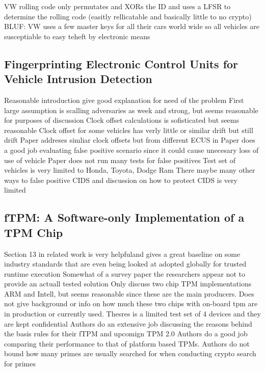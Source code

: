 \documentclass[conference]{journal}
\begin{document}
							
VW rolling code only permutates and XORs the ID and uses a LFSR to determine the rolling code (easitly rellicatable and basically little to no crypto)							
BLUF: VW uses a few master keys for all their cars world wide so all vehicles are susceptiable to easy teheft by electronic means	

\subsection{Fingerprinting Electronic Control Units for Vehicle Intrusion Detection \cite{cho_fingerprinting_2016}}
						
Reasonable introduction give good explanation for need of the problem	
First large assumption is scalling adversaries as week and strong, but seems reasonable for purposes of discussion	
Clock offset calculations is sofisticated but seems reasonable	
Clock offset for some vehicles has verly little or similar drift but still drift	
Paper addreses simliar clock offsets but from different ECUS in 	
Paper does a good job evaluating false positive scenario since it could cause unecesary loss of use of vehicle	
Paper does not run many tests for false positives	
Test set of vehicles is very limited to Honda, Toyota, Dodge Ram	
There maybe many other ways to false positive CIDS and discussion on how to protect CIDS is very limited	

\subsection{fTPM: A Software-only Implementation of a TPM Chip \cite{raj_ftpm:_2016}}
Section 13 in related work is very helpfuland gives a great baseline on some industry standards that are even being looked at adopted globally for trusted runtime execution	
Somewhat of a survey paper the researchers appear not to provide an actuall tested solution	
Only discuss two chip TPM implementations ARM and Intell, but seems reasonable since these are the main producers. 	
Does not give background or info on how much these two chips with on-board tpm are in production or currently used.	
Thesres is a limited test set of 4 devices and they are kept confidential	
Authors do an extensive job discussing the reasons behind the basis rules for their fTPM and upcomign TPM 2.0	
Authors do a good job comparing their performance to that of platform based TPMs.	
Authors do not bound how many primes are usually searched for when conducting crypto search for primes	

\nocite{*}			



\end{document}
